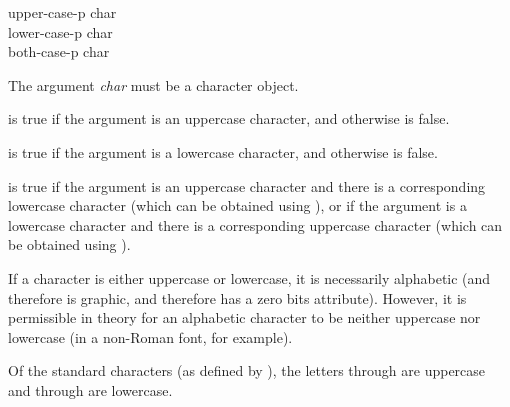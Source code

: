 \begin{defun}[Function]
upper-case-p char \\
lower-case-p char \\
both-case-p char

The argument \emph{char} must be a character object.

 is true if the argument is an uppercase
character, and otherwise is false.

 is true if the argument is a lowercase
character, and otherwise is false.

 is true if the argument is an uppercase character and
there is a corresponding lowercase character (which can be obtained
using ), or if the argument is a lowercase character and
there is a corresponding uppercase character (which can be obtained
using ).

If a character is either uppercase or lowercase, it is necessarily
alphabetic (and therefore is graphic, and therefore has a zero bits
attribute).  However, it is permissible in theory for an alphabetic
character to be neither uppercase nor lowercase (in a non-Roman font,
for example).

Of the standard characters (as defined by ),
the letters  through  are uppercase and 
through  are lowercase.
\end{defun}

